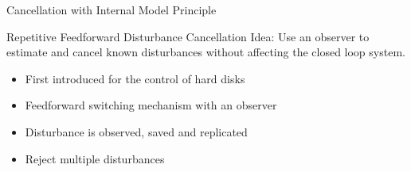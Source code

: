 \documentclass[10pt]{beamer}
\begin{document}
\begin{frame}{Cancellation with Internal Model Principle}
  \begin{figure}[h!]
    \centering %
    \qquad
  \end{figure}
\end{frame}

\begin{frame}{Repetitive Feedforward Disturbance Cancellation}
  \alert{Idea}: Use an observer to estimate and cancel known disturbances without affecting the closed loop system.
  \begin{itemize}
    \item First introduced for the control of hard disks
    \item Feedforward switching mechanism with an observer
    \item Disturbance is observed, saved and replicated
    \item Reject multiple disturbances
  \end{itemize}
\end{frame}
\end{document}

